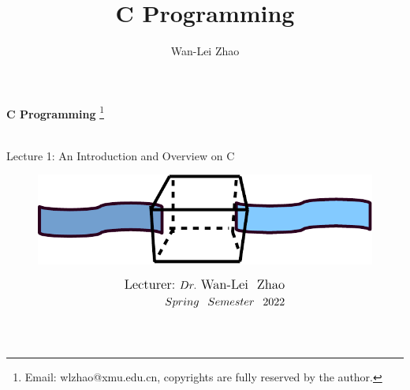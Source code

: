 \documentclass[]{beamer}
\title{C Programming}
\author{Wan-Lei Zhao}
\newcommand\blfootnote[1]{
  \begingroup
  \renewcommand\thefootnote{}\footnote{#1}
  \addtocounter{footnote}{-1}
  \endgroup
}
\begin{document}
\begin{frame}
   \begin{center}
    \vspace{24pt}
    \Huge\textbf{C Programming}\blfootnote{Email: wlzhao@xmu.edu.cn, copyrights are fully reserved by the author.}\\
     \Huge{Lecture 1: An Introduction and Overview on C}
      \begin{figure}
     	\begin{center}
     		\includegraphics[width=0.3\linewidth]{figs/turingma.pdf}
     	\end{center}
     \end{figure}
    \vspace{36pt}
  \end{center}
  \begin{align*}
   \vspace{18pt}
      \large{\mbox{Lecturer:}~Dr.~\mbox{Wan-Lei~~Zhao}} \\
      \large{Spring~~Semester~~2022} \\
   \vspace{30pt}
  \end{align*}
\end{frame}






\section{}
\end{document}
